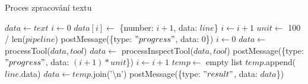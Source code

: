 \begin{algorithm}
\caption{Proces zpracování textu}
\label{alg:Proces zpracování textu}
\begin{algorithmic}[1]
     
        \State $data \gets text$
    \Else {}
        \State $i \gets 0$
            \State $data[i] \gets$ \{number: $i + 1$, data: $line$\}
            \State $i \gets i + 1$
        \EndFor
    \EndIf
    \State $unit \gets$ 100 / len($pipeline$)
        \State postMessage(\{type: $"progress"$, data: $0$\}) 
    \EndIf
    \State $i \gets 0$
     
                \State $data \gets$ processTool($data, tool$)
            \Else
                \State $data \gets$ processInspectTool($data, tool$)
            \EndIf
        \EndIf
        \State postMessage(\{type: $"progress"$, data: $(i + 1) * unit$\})
        \State $i \gets i + 1$
    \EndFor
     
        \State $temp \gets$ empty list
                \State $temp$.append($line$.data)
            \EndIf
        \EndFor
        \State $data \gets temp$.join('\textbackslash{}n')
    \EndIf
    \State postMessage(\{type: $"result"$, data: $data$\}) 
\EndProcedure
\end{algorithmic}
\end{algorithm}

